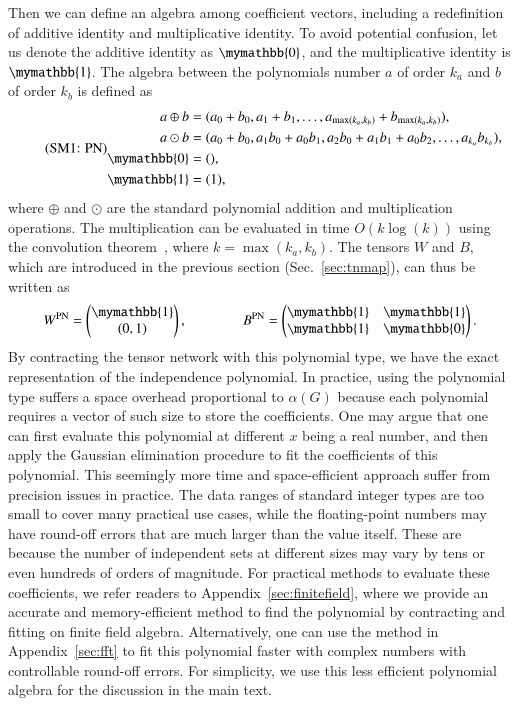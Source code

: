 \documentclass[onefignum, onetabnum]{siamart190516}
\newcommand{\eqname}[1]{\stepcounter{equation}\tag{\theequation : #1}}
\newcommand{\<}{\langle}
\renewcommand{\>}{\rangle}
\newcommand{\App}[1]{Appendix~\ref{#1}}
\begin{document}
Then we can define an algebra among coefficient vectors, including a redefinition of additive identity and multiplicative identity.
To avoid potential confusion, let us denote the additive identity as $\mymathbb{0}$, and the multiplicative identity is $\mymathbb{1}$.
The algebra between the polynomials number $a$ of order $k_a$ and $b$ of order $k_b$ is defined as
\begin{equation}
    \eqname{PN}
    \begin{split}
    a \oplus b &= (a_0 + b_0, a_1 + b_1, \ldots, a_{\max(k_a, k_b)} + b_{\max(k_a, k_b)}),\\
    a \odot b &= (a_0 + b_0, a_1b_0 + a_0b_1, a_{2}b_{0} + a_{1}b_{1} + a_{0}b_{2},  \ldots, a_{k_a} b_{k_b}),\\
    \mymathbb{0} &= (),  \\
    \mymathbb{1} &= (1), \label{eq:polynomial}
    \end{split}
\end{equation}
where $\oplus$ and $\odot$ are the standard polynomial addition and multiplication operations.
The multiplication can be evaluated in time $O(k\log(k))$ using the convolution theorem~\cite{Schonhage1971}, where $k=\max(k_a, k_b)$.
The tensors $W$ and $B$, which are introduced in the previous section (Sec.~\ref{sec:tnmap}), can thus be written as 
\begin{equation}
    W^{\rm PN} = \left(\begin{matrix}
        \mymathbb{1} \\
        (0,1)
    \end{matrix}\right),   
    \qquad \qquad
        B^{\rm PN} = \left(\begin{matrix}
        \mymathbb{1}  & \mymathbb{1} \\
        \mymathbb{1} & \mymathbb{0}
    \end{matrix}\right).
\end{equation}
By contracting the tensor network with this polynomial type, we have the exact representation of the independence polynomial.
In practice, using the polynomial type suffers a space overhead proportional to $\alpha(G)$ because each polynomial requires a vector of such size to store the coefficients. 
One may argue that one can first evaluate this polynomial at different $x$ being a real number,
and then apply the Gaussian elimination procedure to fit the coefficients of this polynomial.
This seemingly more time and space-efficient approach suffer from precision issues in practice.
The data ranges of standard integer types are too small to cover many practical use cases,
while the floating-point numbers may have round-off errors that are much larger than the value itself.
These are because the number of independent sets at different sizes may vary by tens or even hundreds of orders of magnitude.
For practical methods to evaluate these coefficients, we refer readers to \App{sec:finitefield}, where we provide an accurate and memory-efficient method to find the polynomial by contracting and fitting on finite field algebra.
Alternatively, one can use the method in \App{sec:fft} to fit this polynomial faster with complex numbers with controllable round-off errors.
For simplicity, we use this less efficient polynomial algebra for the discussion in the main text.
\end{document}
